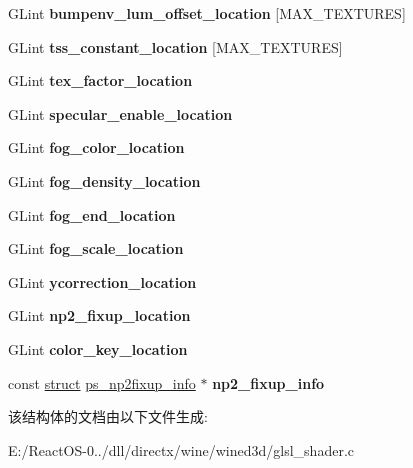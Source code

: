 \begin{DoxyCompactItemize}
G\+Lint {\bfseries bumpenv\+\_\+lum\+\_\+offset\+\_\+location} \mbox{[}M\+A\+X\+\_\+\+T\+E\+X\+T\+U\+R\+ES\mbox{]}
\item 
\mbox{\label{structglsl__ps__program_a53d383e56c0da29de030603ff01070be}} 
G\+Lint {\bfseries tss\+\_\+constant\+\_\+location} \mbox{[}M\+A\+X\+\_\+\+T\+E\+X\+T\+U\+R\+ES\mbox{]}
\item 
\mbox{\label{structglsl__ps__program_a4df17524c8d5327e7b4feacaec3544f3}} 
G\+Lint {\bfseries tex\+\_\+factor\+\_\+location}
\item 
\mbox{\label{structglsl__ps__program_abccae56b236d792d6912a94c6dd0fde7}} 
G\+Lint {\bfseries specular\+\_\+enable\+\_\+location}
\item 
\mbox{\label{structglsl__ps__program_a6aad1b05c0a1411fce2331788e6d066b}} 
G\+Lint {\bfseries fog\+\_\+color\+\_\+location}
\item 
\mbox{\label{structglsl__ps__program_a4bea5c8e23d4c52f8b54aebae51503b8}} 
G\+Lint {\bfseries fog\+\_\+density\+\_\+location}
\item 
\mbox{\label{structglsl__ps__program_a7dae85e4ae6bb61b9b5387744f6c7242}} 
G\+Lint {\bfseries fog\+\_\+end\+\_\+location}
\item 
\mbox{\label{structglsl__ps__program_afddd2a87c4d7ce9944a749c04cf205fc}} 
G\+Lint {\bfseries fog\+\_\+scale\+\_\+location}
\item 
\mbox{\label{structglsl__ps__program_a83e62016710a0cf44d82f95025913f1f}} 
G\+Lint {\bfseries ycorrection\+\_\+location}
\item 
\mbox{\label{structglsl__ps__program_ac0b88f4b3fc7c3cf9955c941eef73509}} 
G\+Lint {\bfseries np2\+\_\+fixup\+\_\+location}
\item 
\mbox{\label{structglsl__ps__program_a22f7223cd61f4a878c4be45cc6b734ca}} 
G\+Lint {\bfseries color\+\_\+key\+\_\+location}
\item 
\mbox{\label{structglsl__ps__program_af2e14e031ff8a4d6926cd98bc2de7650}} 
const \hyperlink{interfacestruct}{struct} \hyperlink{structps__np2fixup__info}{ps\+\_\+np2fixup\+\_\+info} $\ast$ {\bfseries np2\+\_\+fixup\+\_\+info}
\end{DoxyCompactItemize}


该结构体的文档由以下文件生成\+:\begin{DoxyCompactItemize}
\item 
E\+:/\+React\+O\+S-\/0../dll/directx/wine/wined3d/glsl\+\_\+shader.\+c\end{DoxyCompactItemize}
